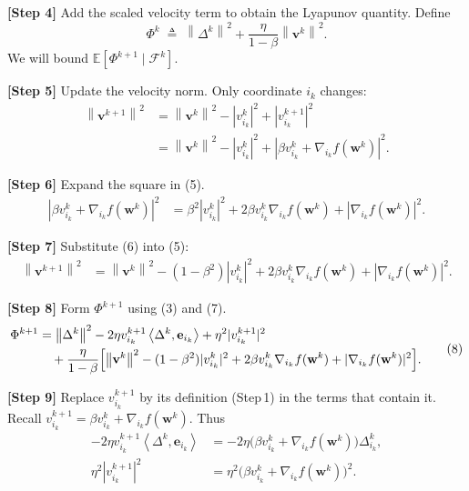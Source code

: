 \documentclass{article}
\newcommand{\E}{\mathbb{E}}
\newcommand{\norm}[1]{\left\|#1\right\|}
\newcommand{\ip}[2]{\left\langle #1,#2\right\rangle}
\begin{document}
\medskip
\noindent\textbf{[Step 4]} Add the scaled velocity term to obtain the Lyapunov quantity.
Define
\[
\Phi^{k}\;\triangleq\;\norm{\Delta^{k}}^{2}
    +\frac{\eta}{1-\beta}\norm{\mathbf v^{k}}^{2}.
\tag{4}
\]
We will bound $\E[\Phi^{k+1}\mid\mathcal F^{k}]$.

\medskip
\noindent\textbf{[Step 5]} Update the velocity norm.
Only coordinate $i_k$ changes:
\[
\begin{aligned}
    \norm{\mathbf v^{k+1}}^{2}
    &=\norm{\mathbf v^{k}}^{2}
      -|v^{k}_{i_k}|^{2}+|v^{k+1}_{i_k}|^{2}\\
    &=\norm{\mathbf v^{k}}^{2}
      -|v^{k}_{i_k}|^{2}
      +|\beta v^{k}_{i_k}+ \nabla_{i_k} f(\mathbf w^{k})|^{2}.
\end{aligned}
\tag{5}
\]

\medskip
\noindent\textbf{[Step 6]} Expand the square in (5).
\[
\begin{aligned}
    |\beta v^{k}_{i_k}+ \nabla_{i_k} f(\mathbf w^{k})|^{2}
    &=\beta^{2}|v^{k}_{i_k}|^{2}
      +2\beta v^{k}_{i_k}\nabla_{i_k} f(\mathbf w^{k})
      +|\nabla_{i_k} f(\mathbf w^{k})|^{2}.
\end{aligned}
\tag{6}
\]

\medskip
\noindent\textbf{[Step 7]} Substitute (6) into (5):
\[
\begin{aligned}
    \norm{\mathbf v^{k+1}}^{2}
    &=\norm{\mathbf v^{k}}^{2}
      -(1-\beta^{2})|v^{k}_{i_k}|^{2}
      +2\beta v^{k}_{i_k}\nabla_{i_k} f(\mathbf w^{k})
      +|\nabla_{i_k} f(\mathbf w^{k})|^{2}.
\end{aligned}
\tag{7}
\]

\medskip
\noindent\textbf{[Step 8]} Form $\Phi^{k+1}$ using (3) and (7).
\[
\begin{aligned}
\Phi^{k+1}
&= \norm{\Delta^{k}}^{2}
   -2\eta v^{k+1}_{i_k}\ip{\Delta^{k}}{\mathbf e_{i_k}}
   +\eta^{2}|v^{k+1}_{i_k}|^{2} \\
&\quad +\frac{\eta}{1-\beta}\Bigl[
      \norm{\mathbf v^{k}}^{2}
      -(1-\beta^{2})|v^{k}_{i_k}|^{2}
      +2\beta v^{k}_{i_k}\nabla_{i_k} f(\mathbf w^{k})
      +|\nabla_{i_k} f(\mathbf w^{k})|^{2}
   \Bigr].
\end{aligned}
\tag{8}
\]

\medskip
\noindent\textbf{[Step 9]} Replace $v^{k+1}_{i_k}$ by its definition (Step 1) in the terms that contain it.
Recall $v^{k+1}_{i_k}= \beta v^{k}_{i_k}+ \nabla_{i_k} f(\mathbf w^{k})$.
Thus
\[
\begin{aligned}
   -2\eta v^{k+1}_{i_k}\ip{\Delta^{k}}{\mathbf e_{i_k}}
   &= -2\eta\bigl(\beta v^{k}_{i_k}+ \nabla_{i_k} f(\mathbf w^{k})\bigr)\Delta^{k}_{i_k},\\
   \eta^{2}|v^{k+1}_{i_k}|^{2}
   &=\eta^{2}\bigl(\beta v^{k}_{i_k}+ \nabla_{i_k} f(\mathbf w^{k})\bigr)^{2}.
\end{aligned}
\tag{9}
\]
\end{document}
